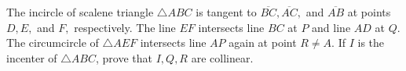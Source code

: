 The incircle of scalene triangle $\triangle{ABC}$ is tangent to $\overline{BC}, \overline{AC},$ and $\overline{AB}$ at points $D, E,$ and $F,$ respectively. The line $EF$ intersects line $BC$ at $P$ and line $AD$ at $Q.$ The circumcircle of $\triangle{AEF}$ intersects line $AP$ again at point $R \neq A$. If $I$ is the incenter of $\triangle{ABC}$, prove that $I,Q,R$ are collinear.